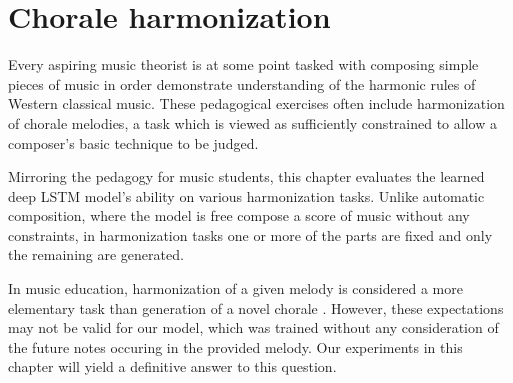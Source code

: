 \chapter{Chorale harmonization}\label{ch:harmonization}

\ifpdf
    \graphicspath{{Chapter6/Figs/Raster/}{Chapter6/Figs/PDF/}{Chapter6/Figs/}}
\else
    \graphicspath{{Chapter6/Figs/Vector/}{Chapter6/Figs/}}
\fi

Every aspiring music theorist is at some point tasked with composing simple
pieces of music in order demonstrate understanding of the harmonic rules of
Western classical music. These pedagogical exercises often include
harmonization of chorale melodies, a task which is viewed as sufficiently
constrained to allow a composer's basic technique to be judged.

Mirroring the pedagogy for music students, this chapter evaluates the learned
deep LSTM model's ability on various harmonization tasks. Unlike automatic
composition, where the model is free compose a score of music without any
constraints, in harmonization tasks one or more of the parts are fixed and only
the remaining are generated.

In music education, harmonization of a given melody is considered a more
elementary task than generation of a novel chorale
\cite{denny1960oxford,piston1978harmony}. However, these expectations may not
be valid for our model, which was trained without any consideration of the
future notes occuring in the provided melody. Our experiments in this chapter
will yield a definitive answer to this question.





